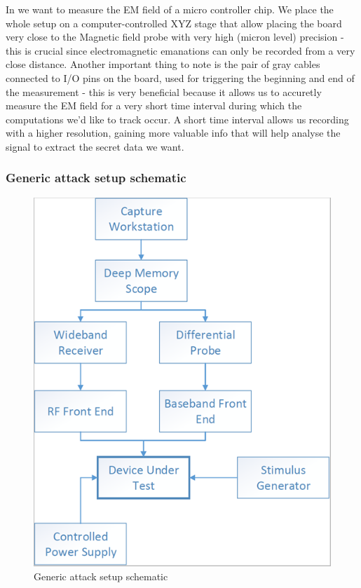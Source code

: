 In  we want to measure the EM field of a micro controller chip. We place the whole setup on a computer-controlled XYZ stage that allow placing the board very close to the Magnetic field probe with very high (micron level) precision - this is crucial since electromagnetic emanations can only be recorded from a very close distance. Another important thing to note is the pair of gray cables connected to I/O pins on the board, used for triggering the beginning and end of the measurement - this is very beneficial because it allows us to accuretly measure the EM field for a very short time interval during which the computations we'd like to track occur. A short time interval allows us recording with a higher resolution, gaining more valuable info that will help analyse the signal to extract the secret data we want.

\subsubsection{Generic attack setup schematic}
\begin{figure}[!ht]
    \centering
    \includegraphics[width=1.0\linewidth]{images/chapter4/attacker_setup_schematic.png}
    \caption{Generic attack setup schematic} \label{fig:attack_setup_schematic}
\end{figure}

